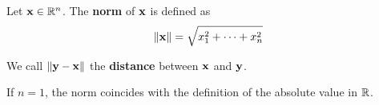 \documentclass[../main.tex]{subfiles}
\begin{document}
\begin{definition}\label{dfn:18.6}
    Let $\mathbf{x}\in\mathbb{R}^n$. The \textbf{norm} of $\mathbf{x}$ is defined as
    \begin{equation*}
        \norm{\mathbf{x}} = \sqrt{x_1^2+\cdots+x_n^2}
    \end{equation*}
\end{definition}

\begin{definition}\label{dfn:18.7}
    We call $\norm{\mathbf{y}-\mathbf{x}}$ the \textbf{distance} between $\mathbf{x}$ and $\mathbf{y}$.
\end{definition}

\begin{remark}\label{rmk:18.8}
    If $n=1$, the norm coincides with the definition of the absolute value in $\mathbb{R}$.
\end{remark}
\end{document}

